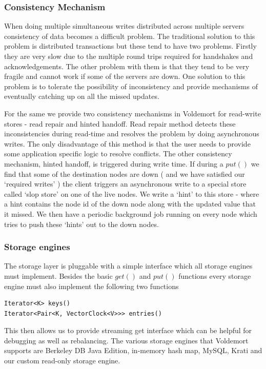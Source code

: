 \documentclass[10pt,twocolumn,preprint,natbib,authoryear]{sigplanconf}
\begin{document}
\subsubsection {Consistency Mechanism }

When doing multiple simultaneous writes distributed across multiple servers consistency of data becomes a difficult problem. The traditional solution to this problem is distributed transactions but these tend to have two problems. Firstly they are very slow due to the multiple round trips required for handshakes and acknowledgements. The other problem with them is that they tend to be very fragile and cannot work if some of the servers are down. One solution to this problem is to tolerate the possibility of inconsistency and provide mechanisms of eventually catching up on all the missed updates. 

For the same we provide two consistency mechanisms in Voldemort for read-write stores - read repair and hinted handoff. Read repair method detects these inconsistencies during read-time and resolves the problem by doing asynchronous writes. The only disadvantage of this method is that the user needs to provide some application specific logic to resolve conflicts. The other consistency mechanism, hinted handoff, is triggered during write time. If during a $put()$ we find that some of the destination nodes are down ( and we have  satisfied our `required writes' ) the client triggers an asynchronous write to a special store called `slop store' on one of the live nodes. We write a `hint' to this store - where a hint contains the node id of the down node along with the updated value that it missed. We then have a periodic background job running on every node which tries to push these `hints' out to the down nodes.

\subsubsection {Storage engines}
The storage layer is pluggable with a simple interface which all storage engines must implement. Besides the basic $get()$ and $put()$ functions every storage engine must also implement the following two functions 

\scriptsize
\begin{verbatim}
Iterator<K> keys() 
Iterator<Pair<K, VectorClock<V>>> entries()
\end{verbatim}  
\normalsize

This then allows us to provide streaming get interface which can be helpful for debugging as well as rebalancing. The various storage engines that Voldemort supports are Berkeley DB Java Edition, in-memory hash map, MySQL, Krati and our custom read-only storage engine. 
\end{document}
